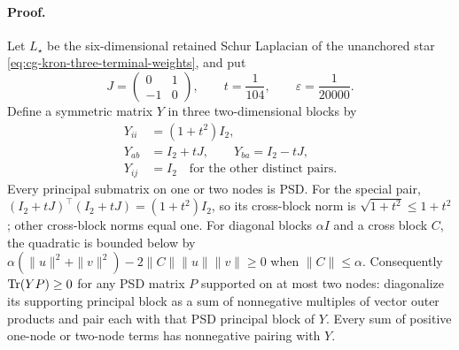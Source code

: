 \paragraph{Proof.}
Let \(L_\star\) be the six-dimensional retained Schur Laplacian of
the unanchored star
\eqref{eq:cg-kron-three-terminal-weights}, and put
\begin{equation}
J=\begin{pmatrix}0&1\\-1&0\end{pmatrix},\qquad
t=\frac1{104},\qquad \varepsilon=\frac1{20000}.
\label{eq:cg-kron-rational-separator-constants}
\end{equation}
Define a symmetric matrix \(Y\) in three two-dimensional blocks by
\begin{equation}
\begin{aligned}
Y_{ii}&=(1+t^2)I_2,\\
Y_{ab}&=I_2+tJ,\qquad Y_{ba}=I_2-tJ,\\
Y_{ij}&=I_2\quad\text{for the other distinct pairs}.
\end{aligned}
\label{eq:cg-kron-rational-separator}
\end{equation}
Every principal submatrix on one or two nodes is PSD.
For the special pair,
\((I_2+tJ)^\top(I_2+tJ)=(1+t^2)I_2\), so its cross-block norm is
\(\sqrt{1+t^2}\leq1+t^2\); other cross-block norms equal one.
For diagonal blocks \(\alpha I\) and a cross block \(C\),
the quadratic is bounded below by
\(\alpha(\|u\|^2+\|v\|^2)-2\|C\|\|u\|\|v\|\geq0\)
when \(\|C\|\leq\alpha\).
Consequently \(\operatorname{Tr}(YP)\geq0\) for any PSD matrix \(P\) supported
on at most two nodes: diagonalize its supporting principal block
as a sum of nonnegative multiples of vector outer products and
pair each with that PSD principal block of \(Y\).
Every sum of positive one-node or two-node terms has nonnegative
pairing with \(Y\).

